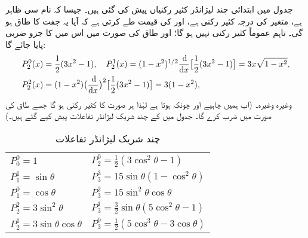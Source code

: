 جدول  میں ابتدائی چند لیژانڈر کثیر رکنیاں پیش کی گئی ہیں۔ جیسا کہ نام سی ظاہر ہے،  متغیر  کی درجہ  کثیر رکنی ہے، اور  کی قیمت طے  کرتی ہے کہ آیا یہ جفت کا طاق ہو گی۔ تاہم    عموماً کثیر رکنی نہیں ہو گا؛ اور طاق  کی صورت میں اس میں  کا جزو ضربی پایا جائے گا:
\begin{align*}
P_{2}^{0}(x)&=\frac{1}{2}(3x^{2}-1), \quad P_{2}^{1}(x)=(1-x^{2})^{1/2}\frac{\dif}{\dif{x}}\big[\frac{1}{2}(3x^{2}-1)\big]=3x\sqrt{1-x^{2}}, \\
P_{2}^{2}(x)&=(1-x^{2})\big(\frac{\dif}{\dif{x}}\big)^{2}\big[\frac{1}{2}(3x^{2}-1)\big]=3(1-x^{2}),
\end{align*}
وغیرہ وغیرہ۔  (اب ہمیں  چاہیے اور چونکہ  ہوتا ہے لہٰذا  ہر صورت  کا کثیر رکنی ہو گا جسے طاق  کی صورت میں
  ضرب کرے گا۔ جدول  میں  کے چند شریک لیژانڈر تفاعلات پیش کیے گئے ہیں۔)
\begin{table}
\caption{چند شریک لیژانڈر تفاعلات }
\label{جدول_ابعادی_شریک_لیژانڈر_تفاعلات}
\centering
\begin{tabular}{ll}
$P_0^0=1$ & $P_2^0=\frac{1}{2}(3\cos^2\theta-1)$\\[0.25em]
$P_1^1=\sin\theta$ & $P_3^3=15\sin\theta(1-\cos^2\theta)$\\[0.25em]
$P_1^0=\cos\theta$ & $P_3^2=15\sin^2\theta\cos\theta$\\[0.25em]
$P_2^2=3\sin^2\theta$ & $P_3^1=\frac{3}{2}\sin\theta(5\cos^2\theta-1)$\\[0.25em]
$P_2^1=3\sin\theta\cos\theta$ & $P_3^0=\frac{1}{2}(5\cos^3\theta-3\cos\theta)$
\end{tabular}
\end{table}

